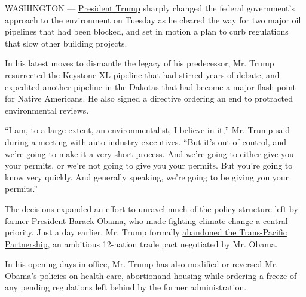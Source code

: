 WASHINGTON ---
\href{https://www.nytimes.com/topic/person/donald-trump}{President
Trump} sharply changed the federal government's approach to the
environment on Tuesday as he cleared the way for two major oil pipelines
that had been blocked, and set in motion a plan to curb regulations that
slow other building projects.

In his latest moves to dismantle the legacy of his predecessor, Mr.
Trump resurrected the
\href{https://www.nytimes.com/topic/subject/keystone-xl-pipeline?inline=nyt-classifier}{Keystone
XL} pipeline that had
\href{https://www.nytimes.com/2015/11/07/us/obama-expected-to-reject-construction-of-keystone-xl-oil-pipeline.html}{stirred
years of debate}, and expedited another
\href{https://www.nytimes.com/2016/12/05/us/veterans-north-dakota-standing-rock.html}{pipeline
in the Dakotas} that had become a major flash point for Native
Americans. He also signed a directive ordering an end to protracted
environmental reviews.

``I am, to a large extent, an environmentalist, I believe in it,'' Mr.
Trump said during a meeting with auto industry executives. ``But it's
out of control, and we're going to make it a very short process. And
we're going to either give you your permits, or we're not going to give
you your permits. But you're going to know very quickly. And generally
speaking, we're going to be giving you your permits.''

The decisions expanded an effort to unravel much of the policy structure
left by former President
\href{https://www.nytimes.com/topic/person/barack-obama?inline=nyt-per}{Barack
Obama}, who made fighting
\href{https://www.nytimes.com/topic/subject/global-warming-climate-change?inline=nyt-classifier\%5C}{climate
change} a central priority. Just a day earlier, Mr. Trump formally
\href{https://www.nytimes.com/2017/01/23/us/politics/tpp-trump-trade-nafta.html?hp\&action=click\&pgtype=Homepage\&clickSource=story-heading\&module=first-column-region\&region=top-news\&WT.nav=top-news}{abandoned
the Trans-Pacific Partnership}, an ambitious 12-nation trade pact
negotiated by Mr. Obama.

In his opening days in office, Mr. Trump has also modified or reversed
Mr. Obama's policies on
\href{https://www.nytimes.com/2017/01/20/us/politics/trump-executive-order-obamacare.html}{health
care},
\href{https://www.nytimes.com/2017/01/23/world/trump-ban-foreign-aid-abortions.html}{abortion}and
housing while ordering a freeze of any pending regulations left behind
by the former administration.

